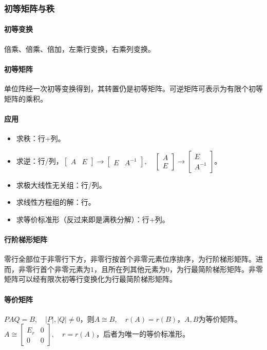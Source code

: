 \documentclass[
12pt, %
a4paper, 
oneside, %
]{scrartcl}
\begin{document}
\subsubsection[初等矩阵与秩]{初等矩阵与秩}
\paragraph{初等变换}
倍乘、倍乘、倍加，左乘行变换，右乘列变换。
\paragraph{初等矩阵}
单位阵经一次初等变换得到，其转置仍是初等矩阵。可逆矩阵可表示为有限个初等矩阵的乘积。
\paragraph{应用}
\begin{itemize}
\item 求秩：行+列。
\item 求逆：行/列，$ \begin{bmatrix} A & E \end{bmatrix} \rightarrow \begin{bmatrix} E & A^{-1} \end{bmatrix}, \quad \begin{bmatrix} A \\ E \end{bmatrix} \rightarrow \begin{bmatrix} E \\ A^{-1} \end{bmatrix} $。
\item 求极大线性无关组：行/列。
\item 求线性方程组的解：行。
\item 求等价标准形（反过来即是满秩分解）：行+列。
\end{itemize}
\paragraph{行阶梯形矩阵}
零行全部位于非零行下方，非零行按首个非零元素位序排序，为行阶梯形矩阵。进而，非零行首个非零元素为$ 1 $，且所在列其他元素为$ 0 $，为行最简阶梯形矩阵。非零矩阵可以经有限次初等行变换化为行最简阶梯形矩阵。
\paragraph{等价矩阵}
$ PAQ = B, \quad |P|, |Q| \neq 0 $，则$ A \cong B, \quad r(A) = r(B) $，$ A, B $为等价矩阵。$ A \cong \begin{bmatrix} E_r & 0 \\ 0 & 0 \end{bmatrix}, \quad r = r(A) $，后者为唯一的等价标准形。
\end{document}
